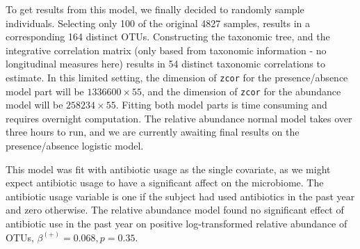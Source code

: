 \documentclass[12pt]{article}
\begin{document}
To get results from this model, we finally decided to randomly sample individuals. Selecting only 100 of the original 4827 samples, results in a corresponding 164 distinct OTUs. Constructing the taxonomic tree, and the integrative correlation matrix (only based from taxonomic information - no longitudinal measures here) results in 54 distinct taxonomic correlations to estimate. In this limited setting, the dimension of \texttt{zcor} for the presence/absence model part will be $1336600 \times 55$, and the dimension of \texttt{zcor} for the abundance model will be $258234 \times 55$. Fitting both model parts is time consuming and requires overnight computation. The relative abundance normal model takes over three hours to run, and we are currently awaiting final results on the presence/absence logistic model.

This model was fit with antibiotic usage as the single covariate, as we might expect antibiotic usage to have a significant affect on the microbiome. The antibiotic usage variable is one if the subject had used antibiotics in the past year and zero otherwise. The relative abundance model found no significant effect of antibiotic use in the past year on positive log-transformed relative abundance of OTUs, $\beta^{(+)} = 0.068, p = 0.35$.


%
\end{document}
